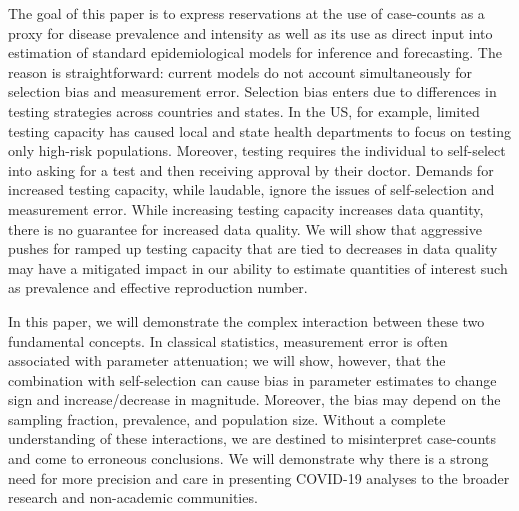 \documentclass[aoas]{amsart}
\begin{document}
The goal of this paper is to express reservations at the use of case-counts as a proxy for disease prevalence and intensity as well as its use as direct input into estimation of standard epidemiological models for inference and forecasting.  The reason is straightforward: current models do not account simultaneously for selection bias and measurement error. Selection bias enters due to differences in testing strategies across countries and states.  In the US, for example, limited testing capacity has caused local and state health departments to focus on testing only high-risk populations.  Moreover, testing requires the individual to self-select into asking for a test and then receiving approval by their doctor.  Demands for increased testing capacity, while laudable, ignore the issues of self-selection and measurement error. While increasing testing capacity increases data quantity, there is no guarantee for increased data quality.  We will show that aggressive pushes for ramped up testing capacity that are tied to decreases in data quality may have a mitigated impact  in our ability to estimate quantities of interest such as prevalence and effective reproduction number.

In this paper, we will demonstrate the complex interaction between these two fundamental concepts.  In classical statistics, measurement error is often associated with parameter attenuation; we will show, however, that the combination with self-selection can cause bias in parameter estimates to change sign and increase/decrease in magnitude.  Moreover, the bias may depend on the sampling fraction, prevalence, and population size.  Without a complete understanding of these interactions, we are destined to misinterpret case-counts and come to erroneous conclusions.   We will demonstrate why there is a strong need for more precision and care in presenting COVID-19 analyses to the broader research and non-academic communities.




\end{document}
